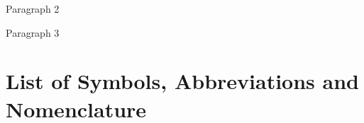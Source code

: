 \documentclass[12pt]{ucalgthes1}
\begin{document}
Paragraph 2

Paragraph 3

\begin{singlespace}
\newpage
{}
\tableofcontents
\pagestyle{plain}
\newpage
{}
\listoftables
\pagestyle{plain}
\newpage
{}
\listoffigures
\pagestyle{plain}
\clearpage
\clearpage          %
\end{singlespace}
\newpage
{}
\chapter*{\bf{List of Symbols, Abbreviations and Nomenclature}\hfill} 
\listofsymbols
\pagestyle{plain}
\clearpage



\appendix

\end{document}
